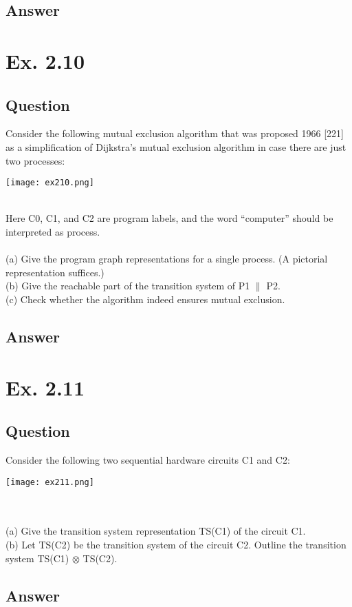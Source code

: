 \documentclass[12pt]{article}
\begin{document}
\subsection*{Answer}

\newpage
\section*{Ex. 2.10}
\subsection*{Question}
Consider the following mutual exclusion algorithm that was proposed 1966 [221]
as a simplification of Dijkstra’s mutual exclusion algorithm in case there are just two processes:\\
\begin{centering}
	\texttt{[image: ex210.png]}
\end{centering}\\
Here C0, C1, and C2 are program labels, and the word “computer” should be interpreted as process.\\
\\
(a) Give the program graph representations for a single process. (A pictorial representation
suffices.)\\
(b) Give the reachable part of the transition system of P1 $\|$ P2.\\
(c) Check whether the algorithm indeed ensures mutual exclusion.

\subsection*{Answer}

\newpage
\section*{Ex. 2.11}
\subsection*{Question}
Consider the following two sequential hardware circuits C1 and C2:\\
\begin{centering}
	\texttt{[image: ex211.png]}
\end{centering}\\
\\
(a) Give the transition system representation TS(C1) of the circuit C1.\\
(b) Let TS(C2) be the transition system of the circuit C2. Outline the transition system TS(C1) $\otimes$
TS(C2).

\subsection*{Answer}
\end{document}
